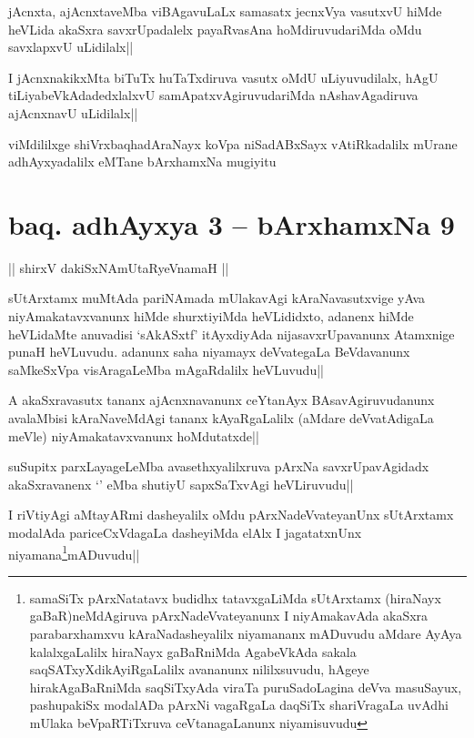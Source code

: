 \begin{artha}
jAcnxta, ajAcnxtaveMba viBAgavuLaLx samasatx jecnxVya vasutxvU hiMde heVLida akaSxra savxrUpadalelx payaRvasAna hoMdiruvudariMda oMdu savxlapxvU uLidilalx||
\end{artha}

\begin{artha}
I jAcnxnakikxMta biTuTx huTaTxdiruva vasutx oMdU uLiyuvudilalx, hAgU tiLiyabeVkAdadedxlalxvU samApatxvAgiruvudariMda nAshavAgadiruva ajAcnxnavU uLidilalx||
\end{artha}

\begin{center}
viMdililxge shiVrxbaqhadAraNayx koVpa niSadABxSayx vAtiRkadalilx mUrane adhAyxyadalilx eMTane bArxhamxNa mugiyitu
\end{center}

\section*{baq. adhAyxya 3 -- bArxhamxNa 9}

\begin{center}%
|| shirxV dakiSxNAmUtaRyeVnamaH ||
\end{center}

\begin{artha}
sUtArxtamx muMtAda pariNAmada mUlakavAgi kAraNavasutxvige yAva niyAmakatavxvanunx hiMde shurxtiyiMda heVLididxto, adanenx hiMde heVLidaMte anuvadisi `sAkASxtf' itAyxdiyAda nijasavxrUpavanunx Atamxnige punaH heVLuvudu. adanunx saha niyamayx deVvategaLa BeVdavanunx saMkeSxVpa visAragaLeMba mAgaRdalilx heVLuvudu||
\end{artha}


\begin{artha}
A akaSxravasutx tananx ajAcnxnavanunx ceYtanAyx BAsavAgiruvudanunx avalaMbisi kAraNaveMdAgi tananx kAyaRgaLalilx (aMdare deVvatAdigaLa meVle) niyAmakatavxvanunx hoMdutatxde||
\end{artha}

\begin{artha}
suSupitx parxLayageLeMba avasethxyalilxruva pArxNa savxrUpavAgidadx akaSxravanenx `\stext ' eMba shutiyU sapxSaTxvAgi heVLiruvudu||
\end{artha}%

\begin{artha}
I riVtiyAgi aMtayARmi dasheyalilx oMdu pArxNadeVvateyanUnx sUtArxtamx modalAda pariceCxVdagaLa dasheyiMda elAlx I jagatatxnUnx niyamana\footnote[1]{samaSiTx pArxNatatavx budidhx tatavxgaLiMda sUtArxtamx (hiraNayx gaBaR)neMdAgiruva pArxNadeVvateyanunx I niyAmakavAda akaSxra parabarxhamxvu kAraNadasheyalilx niyamananx mADuvudu aMdare AyAya kalalxgaLalilx hiraNayx gaBaRniMda AgabeVkAda sakala saqSATxyXdikAyiRgaLalilx avananunx nililxsuvudu, hAgeye hirakAgaBaRniMda saqSiTxyAda viraTa puruSadoLagina deVva masuSayux, pashupakiSx modalADa pArxNi vagaRgaLa daqSiTx shariVragaLa uvAdhi mUlaka beVpaRTiTxruva ceVtanagaLanunx niyamisuvudu}mADuvudu||
\end{artha}

